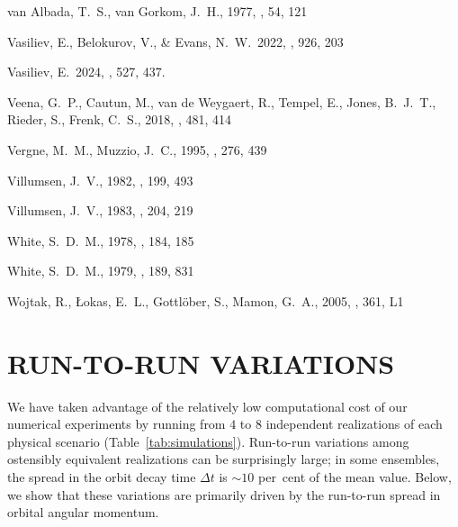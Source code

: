\documentclass[fleqn,usenatbib]{mnras}
\begin{document}
\begin{thebibliography}{}
     van Albada, T.~S., van Gorkom, J.~H., 1977, \aap, 54, 121

     Vasiliev, E., Belokurov, V., \& Evans, N.~W.\ 2022, \apj, 926, 203 %

     Vasiliev, E.\ 2024, \mnras, 527, 437. %

     Veena, G.~P., Cautun, M., van de Weygaert, R., Tempel, E., Jones, B.~J.~T., Rieder, S., Frenk, C.~S., 2018, \mnras, 481, 414
    
     Vergne, M.~M., Muzzio, J.~C., 1995, \mnras, 276, 439 %
    
     Villumsen, J.~V., 1982, \mnras, 199, 493 %
    
     Villumsen, J.~V., 1983, \mnras, 204, 219 %
    
     White, S.~D.~M., 1978, \mnras, 184, 185 %
    
     White, S.~D.~M., 1979, \mnras, 189, 831 %
    
     Wojtak, R., {\L}okas, E.~L., Gottl{\"o}ber, S., Mamon, G.~A., 2005, \mnras, 361, L1 %

\end{thebibliography}

\appendix

\section{RUN-TO-RUN VARIATIONS}

We have taken advantage of the relatively low computational cost of our numerical experiments by running from $4$ to $8$ independent realizations of each physical scenario (Table~\ref{tab:simulations}). Run-to-run variations among ostensibly equivalent realizations can be surprisingly large; in some ensembles, the spread in the orbit decay time $\Delta t$ is $\sim 10$ per~cent of the mean value. Below, we show that these variations are primarily driven by the run-to-run spread in orbital angular momentum.
\end{document}
